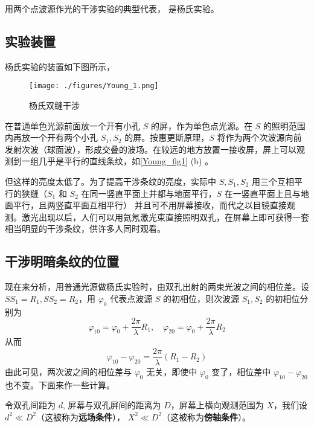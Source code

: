 

用两个点波源作光的干涉实验的典型代表， 是杨氏实验。
\subsection{实验装置}
杨氏实验的装置如下图所示，
\begin{figure}[ht]
\centering
\texttt{[image: ./figures/Young\_1.png]}
\caption{杨氏双缝干涉} \label{Young_fig1}
\end{figure}
在普通单色光源前面放一个开有小孔 $S$ 的屏，作为单色点光源。在 $S $ 的照明范围内再放一个开有两个小孔 $S_1,S_2$ 的屏。按惠更斯原理，$S$ 将作为两个次波源向前发射次波（球面波），形成交叠的波场。在较远的地方放置一接收屏，屏上可以观测到一组几乎是平行的直线条纹，如\autoref{Young_fig1} (b) 。

但这样的亮度太低了。为了提高干涉条纹的亮度，实际中 $S,S_1,S_2$ 用三个互相平行的狭缝（$S_1$ 和 $S_2$ 在同一竖直平面上并都与地面平行，$S$ 在一竖直平面上且与地面平行，且两竖直平面互相平行）
并且可不用屏幕接收，而代之以目镜直接观测。激光出现以后，人们可以用氦氖激光束直接照明双孔，在屏幕上即可获得一套相当明显的干涉条纹，供许多人同时观看。

\subsection{干涉明暗条纹的位置}
现在来分析，用普通光源做杨氏实验时，由双孔出射的两束光波之间的相位差。设 $SS_1=R_1,SS_2=R_2$，用 $\varphi_0$ 代表点波源 $S$ 的初相位，则次波源 $S_1,S_2$ 的初相位分别为
\begin{equation}
\varphi_{10}=\varphi_{0}+\frac{2 \pi}{\lambda} R_{1}, \quad \varphi_{20}=\varphi_{0}+\frac{2 \pi}{\lambda} R_{2}
\end{equation}
从而
\begin{equation}
\varphi_{10}-\varphi_{20}=\frac{2 \pi}{\lambda}\left(R_{1}-R_{2}\right)
\end{equation}
由此可见，两次波之间的相位差与 $\varphi_0$ 无关，即使中 $\varphi_0$ 变了，相位差中 $\varphi_{10}-\varphi_{20}$ 也不变。下面来作一些计算。

令双孔间距为 $d$, 屏幕与双孔屏间的距离为 $D$，屏幕上横向观测范围为 $X$，我们设 $d^{2} \ll D^{2}$（这被称为\textbf{远场条件}）， $X^{2} \ll D^{2}$（这被称为\textbf{傍轴条件}）。

